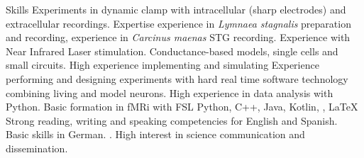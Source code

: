 \begin{rubric}{Skills}
	Experiments in dynamic clamp with intracellular (sharp electrodes) and extracellular recordings. Expertise experience in \textit{Lymnaea stagnalis} preparation and recording, experience in \textit{Carcinus maenas} STG recording.
    Experience with Near Infrared Laser stimulation.
    \large{Conductance-based models}, single cells and small circuits. High experience implementing and simulating 
 Experience performing and designing experiments with hard real time software technology combining living and model neurons. 
    High experience in data analysis with \large{Python}. 
    Basic formation in fMRi with FSL
	Python, C++, Java, Kotlin, , \LaTeX
{}
	Strong reading, writing and speaking competencies for English and Spanish. Basic skills in German.
. High interest in science communication and dissemination.

\end{rubric}

